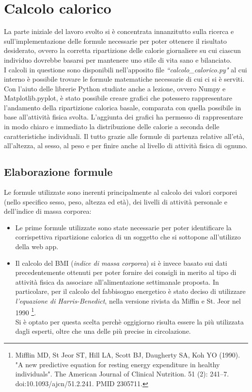 \documentclass[11pt]{article}
\begin{document}
\section{Calcolo calorico}

La parte iniziale del lavoro svolto si è concentrata innanzitutto sulla ricerca e sull'implementazione delle formule necessarie per poter ottenere il risultato desiderato, ovvero la corretta ripartizione delle calorie giornaliere su cui ciascun individuo dovrebbe basarsi per mantenere uno stile di vita sano e bilanciato. \\
I calcoli in questione sono disponibili nell’apposito file \textit{“calcolo\_calorico.py"} al cui interno è possibile trovare le formule matematiche necessarie di cui ci si è serviti.\\Con l’aiuto delle librerie Python studiate anche a lezione, ovvero Numpy e Matplotlib.pyplot, è stato possibile creare grafici che potessero rappresentare l'andamento della ripartizione calorica basale, comparata con quella possibile in base all'attività fisica svolta. L'aggiunta dei grafici ha permesso di rappresentare in modo chiaro e immediato la distribuzione delle calorie a seconda delle caratteristiche individuali. Il tutto grazie alle formule di partenza relative all’età, all’altezza, al sesso, al peso e per finire anche al livello di attività fisica di ognuno.
\subsection{Elaborazione formule} Le formule utilizzate sono inerenti principalmente al calcolo dei valori corporei (nello specifico sesso, peso, altezza ed età), dei livelli di attività personale e dell’indice di massa corporea:
\begin{itemize}
\item Le prime formule utilizzate sono state necessarie per poter identificare la corrispettiva ripartizione calorica di un soggetto che si sottopone all’utilizzo della web app.
\item Il calcolo del  BMI (\textit{indice di massa corporea}) si è invece basato sui dati precedentemente ottenuti per poter fornire dei consigli in merito al tipo di attività fisica da associare all’alimentazione settimanale proposta. In particolare, per il calcolo del fabbisogno energetico è stato deciso di utilizzare \textit{l'equazione di Harris-Benedict}, nella versione rivista da Miffin e St. Jeor nel 1990 \footnote{ Mifflin MD, St Jeor ST, Hill LA, Scott BJ, Daugherty SA, Koh YO (1990). "A new predictive equation for resting energy expenditure in healthy individuals". The American Journal of Clinical Nutrition. 51 (2): 241–7. doi:10.1093/ajcn/51.2.241. PMID 2305711.}.\\ Si è optato per questa scelta perchè oggigiorno risulta essere la più utilizzata dagli esperti, oltre che una delle più precise in circolazione.
\end{itemize}
\end{document}
